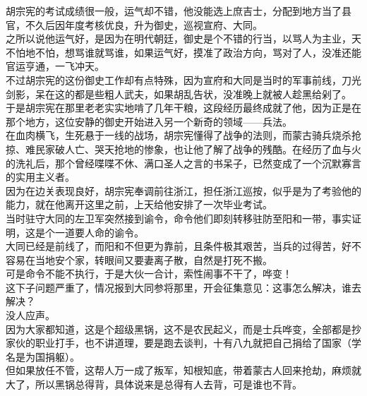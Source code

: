 \begin{multicols}{\theparacolNo}
胡宗宪的考试成绩很一般，运气却不错，他没能选上庶吉士，分配到地方当了县官，不久后因年度考核优良，升为御史，巡视宣府、大同。\\

之所以说他运气好，是因为在明代朝廷，御史是个不错的行当，以骂人为主业，天不怕地不怕，想骂谁就骂谁，如果运气好，摸准了政治方向，骂对了人，没准还能官运亨通，一飞冲天。\\

不过胡宗宪的这份御史工作却有点特殊，因为宣府和大同是当时的军事前线，刀光剑影，呆在这的都是些粗人武夫，如果胡乱告状，没准晚上就被人趁黑给剁了。\\

于是胡宗宪在那里老老实实地啃了几年干粮，这段经历最终成就了他，因为正是在那个地方，这位安静的御史开始进入另一个新奇的领域——兵法。\\

在血肉横飞，生死悬于一线的战场，胡宗宪懂得了战争的法则，而蒙古骑兵烧杀抢掠、难民家破人亡、哭天抢地的惨象，也让他了解了战争的残酷。在经历了血与火的洗礼后，那个曾经喋喋不休、满口圣人之言的书呆子，已然变成了一个沉默寡言的实用主义者。\\

因为在边关表现良好，胡宗宪奉调前往浙江，担任浙江巡按，似乎是为了考验他的能力，就在他离开这里之前，上天给他安排了一次毕业考试。\\

当时驻守大同的左卫军突然接到谕令，命令他们即刻转移驻防至阳和一带，事实证明，这是个一道要人命的谕令。\\

大同已经是前线了，而阳和不但更为靠前，且条件极其艰苦，当兵的过得苦，好不容易在当地安个家，转眼间又要妻离子散，自然是打死不搬。\\

可是命令不能不执行，于是大伙一合计，索性闹事不干了，哗变！\\

这下子问题严重了，情况报到大同参将那里，开会征集意见：这事怎么解决，谁去解决？\\

没人应声。\\

因为大家都知道，这是个超级黑锅，这不是农民起义，而是士兵哗变，全部都是抄家伙的职业打手，也不讲道理，要是跑去谈判，十有八九就把自己捐给了国家（学名是为国捐躯）。\\

但如果放任不管，这帮人万一成了叛军，知根知底，带着蒙古人回来抢劫，麻烦就大了，所以黑锅总得背，具体说来是总得有人去背，可是谁也不背。\\


\end{multicols}
